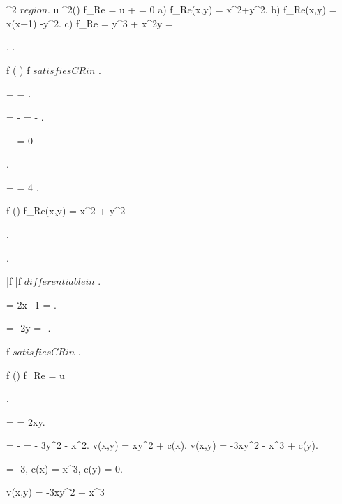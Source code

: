 \documentclass[../Main/main]{subfiles}
\begin{document}
{{{{{				}
			}
		}
	}
	
	

	{
		{
			\Omega \subset \R^2 $ region $.
			u \in \Cc^2(\Omega) \suchthat {}
			{
				f_{Re} = u
			}
		}
		\showthat
		{
			 +  = 0
		}
		\study
		{
			{
				a) \; f_{Re}(x,y) = x^2+y^2.
				b) \; f_{Re}(x,y) = x(x+1) -y^2.
				c) \; \all{ \alpha \in \R }
				{
					f_{Re} = y^3 + \alpha x^2y \logicAnd \Omega = \C
				}
			}
		}
		\demonstration
		{
			{
				, .

				f \in \Hc( \Omega ) \imp f $ satisfies CR in $ \Omega.

				 =  \imp {} = .

				 = -  \imp {} = - .

				\conclude {} +  = 0
			}.

			{

				 +  = 4 .

				\nexists f \in \Hc(\Omega) \suchthat f_{Re}(x,y) = x^2 + y^2
			}.

			{
				.

				\bar{f} \in \polynomial{ \Omega } \imp \bar{f} $ differentiable in $ \Omega.

				{
					 = 2x+1 = .

					 = -2y = -.
				}

				f $ satisfies CR in $ \Omega.

				f \in \Hc(\Omega) \logicAnd f_{Re} = u
			}.

			{
				{
					{
						 =  = 2\alpha xy.

						 = - = - 3y^2 - \alpha x^2.
						v(x,y) = \alpha xy^2 + c(x).
						v(x,y) = -3xy^2 - x^3 + c(y).
						
						\alpha = -3, \; c(x) = x^3, \; c(y) = 0.

						v(x,y) = -3xy^2 + x^3

					}
				}
			}

		}
	}
	
	
	
	
}
\end{document}

